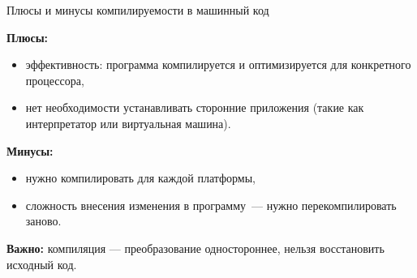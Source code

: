 \documentclass[aspectration=1610,t]{beamer}
\begin{document}
%
%
%

\begin{frame}[fragile]{Плюсы и минусы компилируемости в машинный код}{}

    {\bf Плюсы:}
    \begin{itemize}
        \item эффективность: программа компилируется и оптимизируется для
            конкретного процессора,
        \item нет необходимости устанавливать сторонние приложения (такие как
            интерпретатор или виртуальная машина).
    \end{itemize}
    
    {\bf Минусы:}
    \begin{itemize}
        \item нужно компилировать для каждой платформы,
        \item сложность внесения изменения в программу~--- нужно перекомпилировать заново.
    \end{itemize}

{\bf Важно:} компиляция — преобразование одностороннее, нельзя восстановить исходный код.
\end{frame}
\end{document}
